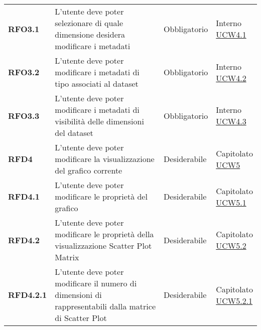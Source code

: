 \begin{longtable}[H]{| >{\raggedright\bfseries}m{20mm} | >{\raggedright}m{90mm} | >{\centering}m{25mm} | >{\centering\arraybackslash}m{30mm}|}
    RFO3.1
     & L'utente deve poter selezionare di quale dimensione desidera modificare i metadati
     & Obbligatorio
     & \makecell{ Interno                                                                                                \\\hyperref[ssub:ucw4.1]{UCW4.1} }\\

    RFO3.2
     & L'utente deve poter modificare i metadati di tipo associati al dataset
     & Obbligatorio
     & \makecell{ Interno                                                                                                \\\hyperref[ssub:ucw4.2]{UCW4.2} }\\

    RFO3.3
     & L'utente deve poter modificare i metadati di visibilità delle dimensioni del dataset
     & Obbligatorio
     & \makecell{ Interno                                                                                                \\  \hyperref[ssub:ucw4.3]{UCW4.3} }\\

    RFD4
     & L'utente deve poter modificare la visualizzazione del grafico corrente
     & Desiderabile
     & \makecell{ Capitolato                                                                                             \\ \hyperref[sub:ucw5]{UCW5} }\\

    RFD4.1
     & L'utente deve poter modificare le proprietà del grafico
     & Desiderabile
     & \makecell{ Capitolato                                                                                             \\ \hyperref[ssub:ucw5.1]{UCW5.1} }\\

    RFD4.2
     & L'utente deve poter modificare le proprietà della visualizzazione Scatter Plot Matrix
     & Desiderabile
     & \makecell{ Capitolato                                                                                             \\ \hyperref[ssub:ucw5.2]{UCW5.2} }\\

    RFD4.2.1
     & L'utente deve poter modificare il numero di dimensioni di rappresentabili dalla matrice di Scatter Plot
     & Desiderabile
     & \makecell{ Capitolato                                                                                             \\ \hyperref[par:ucw5.2.1]{UCW5.2.1} }\\


\end{longtable}
